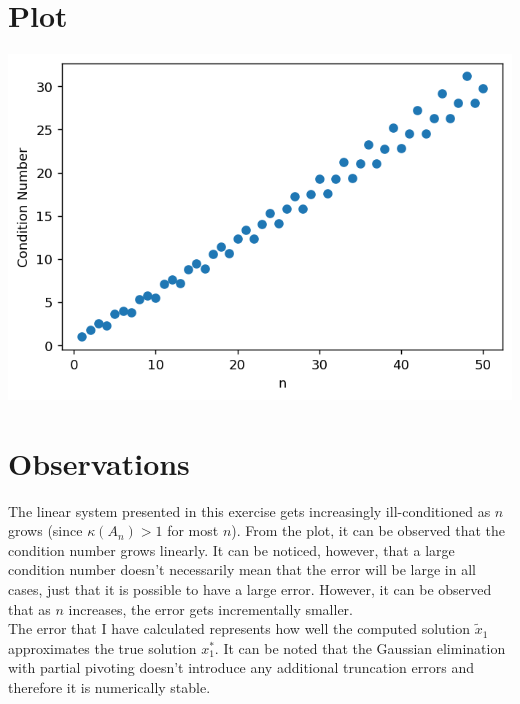 \documentclass{article}
\begin{document}
\section{Plot}
\includegraphics[width=\textwidth,height=\textheight,keepaspectratio]{cond_number.png}

\section{Observations}
The linear system presented in this exercise gets increasingly ill-conditioned as $n$ grows (since $\kappa(A_n)> 1$ for most $n$). From the plot, it can be observed that the condition number grows linearly. It can be noticed, however, that a large condition number doesn’t necessarily mean that the error will be large in all cases, just that it is possible to have a large error. However, it can be observed that as $n$ increases, the error gets incrementally smaller.\\

The error that I have calculated represents how well the computed solution $\widetilde{x}_1$ approximates the true solution $x_1^{\ast}$. It can be noted that the Gaussian elimination with partial pivoting doesn't introduce any additional truncation errors and therefore it is numerically stable.
\end{document}
